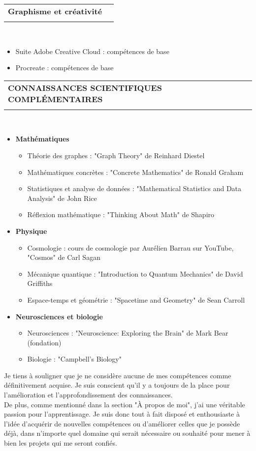 \documentclass[letterpaper,11pt]{article}
\makeatletter
\newcommand{\ressubheading}[4]{
\begin{tabular*}{6.5in}{l@{\cftdotfill{\cftsecdotsep}\extracolsep{\fill}}r}
		\textbf{#1} & #2 \\
		\textit{#3} & \textit{#4} \\
\end{tabular*}\vspace{-6pt}}
\makeatother
\begin{document}
\ressubheading{Graphisme et créativité}{}{}{}\\
\vspace{-0.5cm}
\begin{itemize}[label={}]
\item Suite Adobe Creative Cloud : compétences de base
\item Procreate : compétences de base
\end{itemize}

\ressubheading{CONNAISSANCES SCIENTIFIQUES COMPLÉMENTAIRES}{}{}{}\\
\vspace{-0.5cm}
\begin{itemize}[label={}]
\item \textbf{Mathématiques}
\begin{itemize}[label={}]
\item Théorie des graphes : "Graph Theory" de Reinhard Diestel
\item Mathématiques concrètes : "Concrete Mathematics" de Ronald Graham
\item Statistiques et analyse de données : "Mathematical Statistics and Data Analysis" de John Rice
\item Réflexion mathématique : "Thinking About Math" de Shapiro
\end{itemize}
\item \textbf{Physique}
\begin{itemize}[label={}]
\item Cosmologie : cours de cosmologie par Aurélien Barrau sur YouTube, "Cosmos" de Carl Sagan
\item Mécanique quantique : "Introduction to Quantum Mechanics" de David Griffiths
\item Espace-temps et géométrie : "Spacetime and Geometry" de Sean Carroll
\end{itemize}

\item \textbf{Neurosciences et biologie}
\begin{itemize}[label={}]
\item Neurosciences : "Neuroscience: Exploring the Brain" de Mark Bear (fondation)
\item Biologie : "Campbell's Biology"
\end{itemize}
\end{itemize}

Je tiens à souligner que je ne considère aucune de mes compétences comme définitivement acquise. 
Je suis conscient qu'il y a toujours de la place pour l'amélioration et l'approfondissement des connaissances.\\
De plus, comme mentionné dans la section "À propos de moi", 
j'ai une véritable passion pour l'apprentissage. Je suis donc 
tout à fait disposé et enthousiaste à l'idée d'acquérir de 
nouvelles compétences ou d'améliorer celles que je possède déjà, 
dans n'importe quel domaine qui serait nécessaire ou souhaité pour mener à bien les projets 
qui me seront confiés.\\
\end{document}
